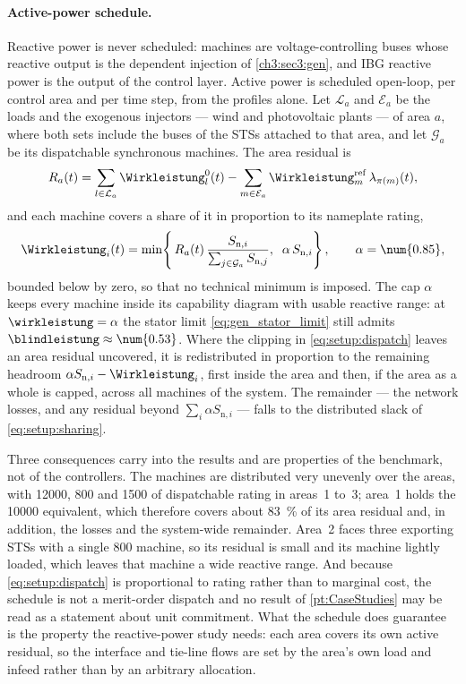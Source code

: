 \paragraph{Active-power schedule.}
Reactive power is never scheduled: machines are voltage-controlling buses whose reactive output is the dependent injection of \cref{ch3:sec3:gen}, and \gls{IBG} reactive power is the output of the control layer.
Active power is scheduled open-loop, per control area and per time step, from the profiles alone.
Let $\mathcal{L}_{a}$ and $\mathcal{E}_{a}$ be the loads and the exogenous injectors --- wind and photovoltaic plants --- of area $a$, where both sets include the buses of the \glspl{STS} attached to that area, and let $\mathcal{G}_{a}$ be its dispatchable synchronous machines.
The area residual is
\begin{equation}
	R_{a}(t) = \sum_{l \in \mathcal{L}_{a}} \Wirkleistung_{l}^{0}(t) - \sum_{m \in \mathcal{E}_{a}} \Wirkleistung_{m}^{\mathrm{ref}}\,\lambda_{\pi(m)}(t),
	\label{eq:setup:residual}
\end{equation}
and each machine covers a share of it in proportion to its nameplate rating,
\begin{equation}
	\Wirkleistung_{i}(t) = \min\!\left\{\,R_{a}(t)\,\frac{S_{\mathrm{n},i}}{\sum_{j \in \mathcal{G}_{a}} S_{\mathrm{n},j}},\;\; \alpha\,S_{\mathrm{n},i}\right\},
	\qquad \alpha = \num{0.85},
	\label{eq:setup:dispatch}
\end{equation}
bounded below by zero, so that no technical minimum is imposed.
The cap $\alpha$ keeps every machine inside its capability diagram with usable reactive range: at $\wirkleistung = \alpha$ the stator limit \cref{eq:gen_stator_limit} still admits $\blindleistung \approx \num{0.53}$.
Where the clipping in \cref{eq:setup:dispatch} leaves an area residual uncovered, it is redistributed in proportion to the remaining headroom $\alpha S_{\mathrm{n},i} - \Wirkleistung_{i}$, first inside the area and then, if the area as a whole is capped, across all machines of the system.
The remainder --- the network losses, and any residual beyond $\sum_{i} \alpha S_{\mathrm{n},i}$ --- falls to the distributed slack of \cref{eq:setup:sharing}.

Three consequences carry into the results and are properties of the benchmark, not of the controllers.
The machines are distributed very unevenly over the areas, with \num{12000}, \num{800} and \qty{1500}{\MVA} of dispatchable rating in areas~1 to~3; area~1 holds the \qty{10000}{\MVA} equivalent, which therefore covers about \SI{83}{\percent} of its area residual and, in addition, the losses and the system-wide remainder.
Area~2 faces three exporting \glspl{STS} with a single \qty{800}{\MVA} machine, so its residual is small and its machine lightly loaded, which leaves that machine a wide reactive range.
And because \cref{eq:setup:dispatch} is proportional to rating rather than to marginal cost, the schedule is not a merit-order dispatch and no result of \cref{pt:CaseStudies} may be read as a statement about unit commitment.
What the schedule does guarantee is the property the reactive-power study needs: each area covers its own active residual, so the interface and tie-line flows are set by the area's own load and infeed rather than by an arbitrary allocation.

